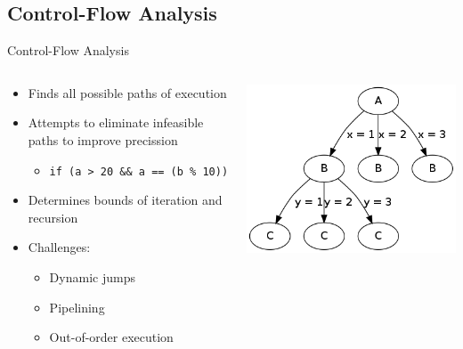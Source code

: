 \documentclass{beamer}
\begin{document}
\subsection{Control-Flow Analysis}
\begin{frame}{Control-Flow Analysis}
  \begin{columns}
    \begin{column}{0.63\textwidth}
      \begin{itemize}
        \item Finds all possible paths of execution
        \item Attempts to eliminate infeasible paths to improve precission
          \begin{itemize}
            \item \texttt{if (a > 20 \&\& a == (b \% 10))}
          \end{itemize}
        \item Determines bounds of iteration and recursion
        \item<2-> Challenges:
          \begin{itemize}
            \item Dynamic jumps
            \item Pipelining
            \item Out-of-order execution
          \end{itemize}
      \end{itemize}
    \end{column}
    \begin{column}{0.37\textwidth}
      \includegraphics[scale=0.35]{controlflowanalysis.png}
    \end{column}
  \end{columns}
\end{frame}
\end{document}
